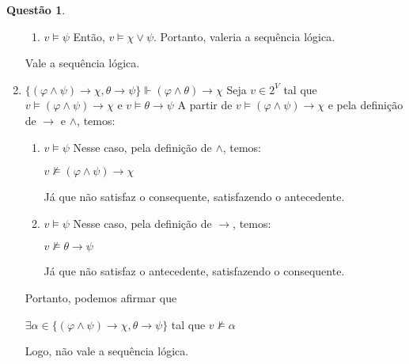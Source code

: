 \documentclass[tikz,border=5]{article}
\theoremstyle{definition}
\newtheorem{exerc}{Questão}
\begin{document}
\begin{exerc}
\begin{enumerate}
\begin{enumerate}
	            \item $v \vDash \psi$ \newline Então, $v \vDash \chi \vee \psi$. Portanto, valeria a sequência lógica.
	        \end{enumerate}
	        Vale a sequência lógica.
	        \item $\{(\varphi \wedge \psi) \rightarrow \chi, \theta \rightarrow \psi\} \Vdash (\varphi \wedge \theta) \rightarrow \chi$ \newline Seja $v \in 2^{V}$ tal que $v \vDash (\varphi \wedge \psi) \rightarrow \chi$ e $v \vDash \theta \rightarrow \psi$ \newline A partir de $v \vDash (\varphi \wedge \psi) \rightarrow \chi$ e pela definição de $\rightarrow$ e $\wedge$, temos:
	        \begin{enumerate}
	            \item $v \vDash \psi$ \newline Nesse caso, pela definição de $\wedge$, temos: \begin{center} $v \nvDash (\varphi \wedge \psi) \rightarrow \chi$ \end{center} Já que não satisfaz o consequente, satisfazendo o antecedente.
	            \item $v \vDash \psi$ \newline Nesse caso, pela definição de $\rightarrow$, temos: \begin{center} $v \nvDash \theta \rightarrow \psi$ \end{center} Já que não satisfaz o antecedente, satisfazendo o consequente.
	        \end{enumerate}
	        Portanto, podemos afirmar que \begin{center} $\exists \alpha \in \{(\varphi \wedge \psi) \rightarrow \chi, \theta \rightarrow \psi\}$ tal que $v \nvDash \alpha$ \end{center} Logo, não vale a sequência lógica.
	    \end{enumerate}
	\end{exerc}
\end{document}
